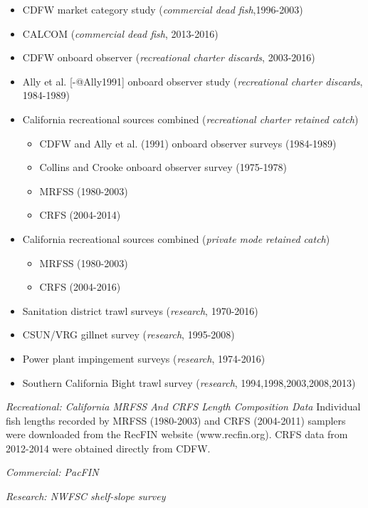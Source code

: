 \documentclass[12pt,]{article}
\begin{document}
\begin{itemize}[noitemsep,nolistsep,topsep=0pt]
  \item CDFW market category study (\emph{commercial dead fish},1996-2003)    
  \item CALCOM (\emph{commercial dead fish}, 2013-2016)    
  \item CDFW onboard observer (\emph{recreational charter discards}, 2003-2016)    
  \item Ally et al. [-@Ally1991] onboard observer study (\emph{recreational charter discards}, 1984-1989)  
  \item California recreational sources combined (\emph{recreational charter retained catch})     
    \begin{itemize}[noitemsep,nolistsep]
      \item CDFW and Ally et al. (1991) onboard observer surveys (1984-1989)     
      \item Collins and Crooke onboard observer survey (1975-1978)     
      \item MRFSS (1980-2003)     
      \item CRFS (2004-2014)
    \end{itemize}
 \item California recreational sources combined (\emph{private mode retained catch})      
    \begin{itemize}[noitemsep,nolistsep]   
      \item MRFSS (1980-2003)      
      \item CRFS (2004-2016)  
    \end{itemize}
 \item Sanitation district trawl surveys (\emph{research}, 1970-2016)      
 \item CSUN/VRG gillnet survey (\emph{research}, 1995-2008)        
 \item Power plant impingement surveys (\emph{research}, 1974-2016) 
 \item Southern California Bight trawl survey (\emph{research}, 1994,1998,2003,2008,2013) 
\end{itemize}

\emph{Recreational: California MRFSS And CRFS Length Composition Data}
Individual fish lengths recorded by MRFSS (1980-2003) and CRFS
(2004-2011) samplers were downloaded from the RecFIN website
(www.recfin.org). CRFS data from 2012-2014 were obtained directly from
CDFW.

\emph{Commercial: PacFIN}

\emph{Research: NWFSC shelf-slope survey}
\end{document}

